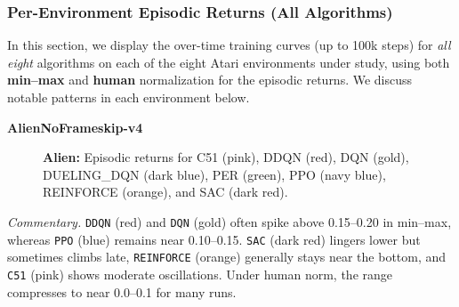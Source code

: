 \subsubsection{Per-Environment Episodic Returns (All Algorithms)}
\label{sssec:per_env_all}

In this section, we display the over-time training curves (up to 100k steps) for 
\emph{all eight} algorithms on each of the eight Atari environments under study, 
using both \textbf{min--max} and \textbf{human} normalization for the episodic returns. 
We discuss notable patterns in each environment below.

\noindent
\textbf{AlienNoFrameskip-v4}
\begin{figure} 
	\centering
	\quad
	\caption{\textbf{Alien:} Episodic returns for C51 (pink), DDQN (red), 
		DQN (gold), DUELING\_DQN (dark blue), PER (green),
		PPO (navy blue), REINFORCE (orange), and SAC (dark red).}
	\label{fig:alien_comparison_combined}
\end{figure}

\noindent
\emph{Commentary.} 
\texttt{DDQN} (red) and \texttt{DQN} (gold) often spike above 0.15--0.20 in min--max, 
whereas \texttt{PPO} (blue) remains near 0.10--0.15. 
\texttt{SAC} (dark red) lingers lower but sometimes climbs late, 
\texttt{REINFORCE} (orange) generally stays near the bottom, and \texttt{C51} (pink) 
shows moderate oscillations. 
Under human norm, the range compresses to near 0.0--0.1 for many runs.

